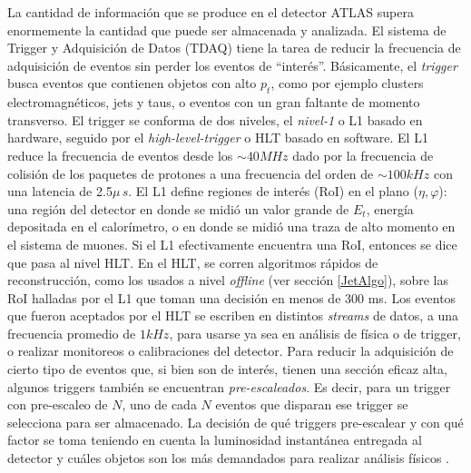 La cantidad de información que se produce en el detector ATLAS supera enormemente la cantidad que puede ser almacenada y analizada. El sistema de Trigger y Adquisición de Datos (TDAQ) tiene la tarea de reducir la frecuencia de adquisición de eventos sin perder los eventos de ``interés''. Básicamente, el \textit{trigger} busca eventos que contienen objetos con alto $p_t$, como por ejemplo clusters electromagnéticos, jets y taus, o eventos con un gran faltante de momento transverso.
El trigger se conforma de dos niveles, el \textit{nivel-1} o L1 basado en hardware, seguido por el \textit{high-level-trigger} o HLT basado en software.
El L1 reduce la frecuencia de eventos desde los $\sim40MHz$ dado por la frecuencia de colisión de los paquetes de protones a una frecuencia del orden de $\sim100kHz$ con una latencia de 2.5$\mu\,s$. El L1 define regiones de interés (RoI) en el plano ($\eta,\varphi$): una región del detector en donde se midió un valor grande de $E_t$, energía depositada en el calorímetro, o en donde se midió una traza de alto momento en el sistema de muones. Si el L1 efectivamente encuentra una RoI, entonces se dice que pasa al nivel HLT. En el HLT, se corren algoritmos rápidos de reconstrucción, como los usados a nivel \textit{offline} (ver sección \ref{JetAlgo}), sobre las RoI halladas por el L1 que toman una decisión en menos de 300 ms. 
Los eventos que fueron aceptados por el HLT se escriben en distintos \textit{streams} de datos, a una frecuencia promedio de $1kHz$, para usarse ya sea en análisis de física o de trigger, o realizar monitoreos o calibraciones del detector. 
Para reducir la adquisición de cierto tipo de eventos que, si bien son de interés, tienen una sección eficaz alta, algunos triggers también se encuentran \textit{pre-escaleados}. Es decir, para un trigger con pre-escaleo de $N$, uno de cada $N$ eventos que disparan ese trigger se selecciona para ser almacenado. La decisión de qué triggers pre-escalear y con qué factor se toma teniendo en cuenta la luminosidad instantánea entregada al detector y cuáles objetos son los más demandados para realizar análisis físicos \cite{Trigger}. 



